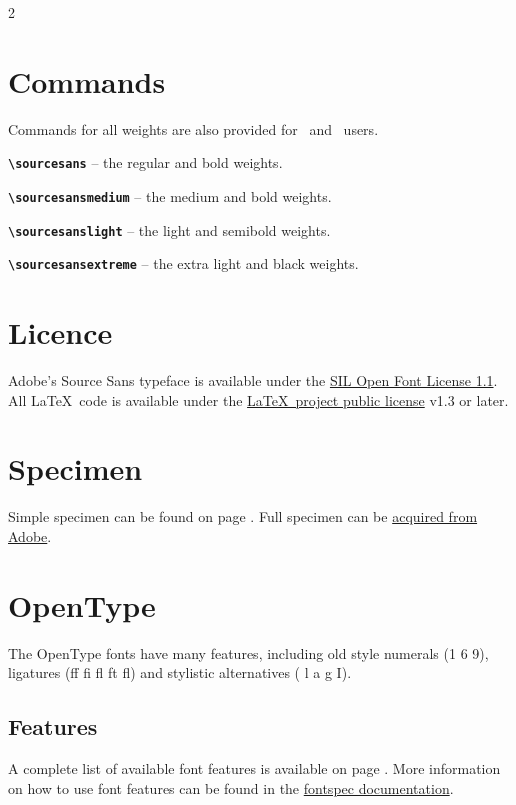 \documentclass[10pt,a4paper,english]{article}
\begin{document}
\begin{multicols}{2}
\section{Commands}
Commands for all weights are also provided for \XeLaTeX\ and \LuaLaTeX\ users.
\begin{itemize*}
	\item \texttt{\bfseries \textbackslash sourcesans}
		-- the regular and bold weights.
	\item \texttt{\bfseries \textbackslash sourcesansmedium}
		-- the medium and bold weights.
	\item \texttt{\bfseries \textbackslash sourcesanslight}
		-- the light and semibold weights.
	\item \texttt{\bfseries \textbackslash sourcesansextreme}
		-- the extra light and black weights.
\end{itemize*}

\section{Licence}
Adobe's Source Sans typeface is available under the \href{http://scripts.sil.org/OFL}{SIL Open Font License 1.1}.\\
All \LaTeX\ code is available under the \href{http://www.latex-project.org/lppl/}{\LaTeX\ project public license} v1.3 or later.

\section{Specimen}
Simple specimen can be found on page \pageref{sec:specimen}. Full specimen can be \href{http://adobe-fonts.github.io/source-sans-pro/}{acquired from Adobe}.

\section{OpenType}
The OpenType fonts have many features, including old style numerals (1 6 9),  ligatures (ff fi fl ft {fl}) and stylistic alternatives ({ l a g I}).

\subsection{Features}
A complete list of available font features is available on page \pageref{sec:otfinfo}. More information on how to use font features can be found in the \href{http://mirror.ctan.org/macros/latex/contrib/fontspec/fontspec.pdf}{fontspec documentation}.


\end{multicols}
\end{document}
